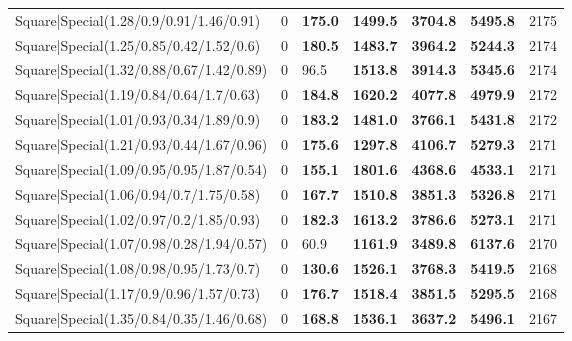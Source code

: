 \begin{tabular}{lrllllr}
 Square|Special(1.28/0.9/0.91/1.46/0.91)                       &             0   & \textbf{175.0} & \textbf{1499.5} & \textbf{3704.8} & \textbf{5495.8} &         2175 \\
 Square|Special(1.25/0.85/0.42/1.52/0.6)                       &             0   & \textbf{180.5} & \textbf{1483.7} & \textbf{3964.2} & \textbf{5244.3} &         2174 \\
 Square|Special(1.32/0.88/0.67/1.42/0.89)                      &             0   & 96.5           & \textbf{1513.8} & \textbf{3914.3} & \textbf{5345.6} &         2174 \\
 Square|Special(1.19/0.84/0.64/1.7/0.63)                       &             0   & \textbf{184.8} & \textbf{1620.2} & \textbf{4077.8} & \textbf{4979.9} &         2172 \\
 Square|Special(1.01/0.93/0.34/1.89/0.9)                       &             0   & \textbf{183.2} & \textbf{1481.0} & \textbf{3766.1} & \textbf{5431.8} &         2172 \\
 Square|Special(1.21/0.93/0.44/1.67/0.96)                      &             0   & \textbf{175.6} & \textbf{1297.8} & \textbf{4106.7} & \textbf{5279.3} &         2171 \\
 Square|Special(1.09/0.95/0.95/1.87/0.54)                      &             0   & \textbf{155.1} & \textbf{1801.6} & \textbf{4368.6} & \textbf{4533.1} &         2171 \\
 Square|Special(1.06/0.94/0.7/1.75/0.58)                       &             0   & \textbf{167.7} & \textbf{1510.8} & \textbf{3851.3} & \textbf{5326.8} &         2171 \\
 Square|Special(1.02/0.97/0.2/1.85/0.93)                       &             0   & \textbf{182.3} & \textbf{1613.2} & \textbf{3786.6} & \textbf{5273.1} &         2171 \\
 Square|Special(1.07/0.98/0.28/1.94/0.57)                      &             0   & 60.9           & \textbf{1161.9} & \textbf{3489.8} & \textbf{6137.6} &         2170 \\
 Square|Special(1.08/0.98/0.95/1.73/0.7)                       &             0   & \textbf{130.6} & \textbf{1526.1} & \textbf{3768.3} & \textbf{5419.5} &         2168 \\
 Square|Special(1.17/0.9/0.96/1.57/0.73)                       &             0   & \textbf{176.7} & \textbf{1518.4} & \textbf{3851.5} & \textbf{5295.5} &         2168 \\
 Square|Special(1.35/0.84/0.35/1.46/0.68)                      &             0   & \textbf{168.8} & \textbf{1536.1} & \textbf{3637.2} & \textbf{5496.1} &         2167 \\

\end{tabular}
